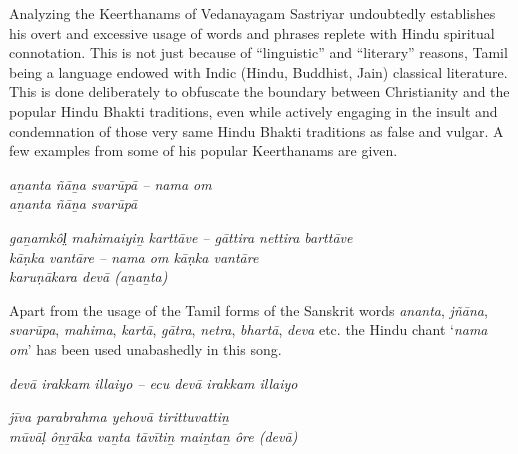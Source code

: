 Analyzing the Keerthanams of Vedanayagam Sastriyar undoubtedly establishes his overt and excessive usage of words and phrases replete with Hindu spiritual connotation. This is not just because of “linguistic” and “literary” reasons, Tamil being a language endowed with Indic (Hindu, Buddhist, Jain) classical literature. This is done deliberately to obfuscate the boundary between Christianity and the popular Hindu Bhakti traditions, even while actively engaging in the insult and condemnation of those very same Hindu Bhakti traditions as false and vulgar. A few examples from some of his popular Keerthanams are given.

\begin{myquote}
\textit{aṉanta ñāṉa svarūpā – nama om\\ aṉanta ñāṉa svarūpā}
\end{myquote}

\begin{myquote}
\textit{gaṉamkôl̤ mahimaiyiṉ karttāve – gāttira nettira barttāve \\ kāṇka vantāre – nama om kāṇka vantāre\\ karuṇākara devā (aṉaṉta) }
\end{myquote}

\begin{myquote}
\end{myquote}

\begin{myquote}
\end{myquote}

Apart from the usage of the Tamil forms of the Sanskrit words \textit{ananta}, \textit{jñāna}, \textit{svarūpa}, \textit{mahima}, \textit{kartā}, \textit{gātra}, \textit{netra}, \textit{bhartā}, \textit{deva} etc. the Hindu chant ‘\textit{nama om}’ has been used unabashedly in this song.

\begin{myquote}
\textit{devā irakkam illaiyo – ecu devā irakkam illaiyo}
\end{myquote}

\begin{myquote}
\textit{jīva parabrahma yehovā tirittuvattiṉ \\ mūvāḷ ôṉṟāka vaṉta tāvītiṉ maiṉtaṉ ôre (devā)}
\end{myquote}

